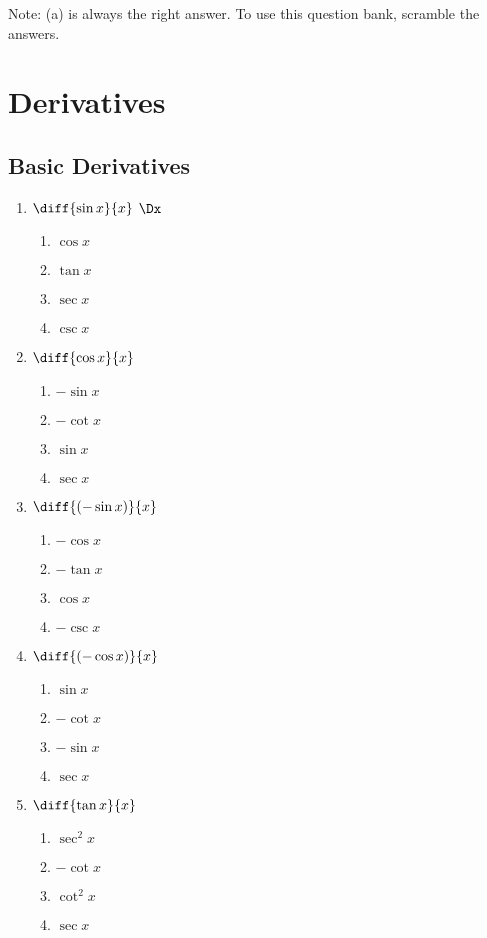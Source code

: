 \documentclass[10pt,twocolumn]{article}
\begin{document}
Note: (a) is always the right answer. To use this question bank, scramble the answers. 

\newpage

\section{Derivatives}

\subsection{Basic Derivatives}
\begin{enumerate}
		\item \(\diff{\sin{x}}{x}\) $\Dx$
	\begin{enumerate}
		\item \(\cos{x}\)
		\item \(\tan{x}\)
		\item \(\sec{x}\)
		\item \(\csc{x}\)
	\end{enumerate}


		\item \(\diff{\cos{x}}{x}\)
	\begin{enumerate}
		\item \(-\sin{x}\)
		\item \(-\cot{x}\)
		\item \(\sin{x}\)
		\item \(\sec{x}\)
	\end{enumerate}


		\item \(\diff{(-\sin{x})}{x}\)
	\begin{enumerate}
		\item \(-\cos{x}\)
		\item \(-\tan{x}\)
		\item \(\cos{x}\)
		\item \(-\csc{x}\)
	\end{enumerate}


		\item \(\diff{(-\cos{x})}{x}\)
	\begin{enumerate}
		\item \(\sin{x}\)
		\item \(-\cot{x}\)
		\item \(-\sin{x}\)
		\item \(\sec{x}\)
	\end{enumerate}


		\item \(\diff{\tan{x}}{x}\)
	\begin{enumerate}
		\item \(\sec^2{x}\)
		\item \(-\cot{x}\)
		\item \(\cot^2{x}\)
		\item \(\sec{x}\)
	\end{enumerate}



\end{enumerate}
\end{document}
